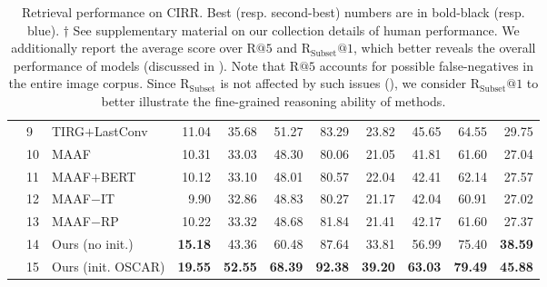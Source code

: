 \documentclass[10pt,twocolumn,letterpaper]{article}
\begin{document}
\begin{table*}[!ht]
{\begin{tabular}{lllrrrrrrrr}
  & 9 & TIRG$+$LastConv~\cite{Vo_2019_tirg}             & 11.04  & 35.68  & 51.27  & 83.29 &  23.82  & 45.65  & 64.55  & 29.75 \\ 
  \cmidrule{2-11}
  & 10 & MAAF~\cite{dodds2020modality_maaf}         & 10.31     & 33.03     & 48.30    & 80.06 &  21.05    & 41.81    & 61.60  & 27.04 \\
  & 11 & MAAF$+$BERT~\cite{dodds2020modality_maaf}  & 10.12     & 33.10     & 48.01 & 80.57    & 22.04    & 42.41    & 62.14   & 27.57 \\
  & 12 & MAAF$-$IT~\cite{dodds2020modality_maaf}    & 9.90      & 32.86     & 48.83 & 80.27    & 21.17    & 42.04    & 60.91   & 27.02 \\
  & 13 & MAAF$-$RP~\cite{dodds2020modality_maaf}    & 10.22     & 33.32     & 48.68 & 81.84    & 21.41    & 42.17    & 61.60   & 27.37 \\
  \midrule
  & 14 & Ours (no init.)    & {\color{blue}\textbf{15.18}}  & 43.36  & 60.48  & 87.64  & 33.81   & 56.99  & 75.40  & {\color{blue}\textbf{38.59}} \\ 
  & 15 & Ours (init. OSCAR) & \textbf{19.55}  & \textbf{52.55}  & \textbf{68.39}  & \textbf{92.38} &  {\color{blue}\textbf{39.20}}  & \textbf{63.03}  & \textbf{79.49}  & \textbf{45.88} \\ 

  \bottomrule
  \end{tabular}}
  \caption{Retrieval performance on CIRR. Best (resp. second-best) numbers are in bold-black (resp. blue). $\dagger$ See supplementary material on our collection details of human performance. We additionally report the average score over R$@5$ and R$_{\text{Subset}}@1$, which better reveals the overall performance of models (discussed in ). Note that R$@5$ accounts for possible false-negatives in the entire image corpus. Since R$_{\text{Subset}}$ is not affected by such issues (), we consider R$_{\text{Subset}}@1$ to better illustrate the fine-grained reasoning ability of methods.}
  \label{tab:baseline_0}
\end{table*}
\end{document}
